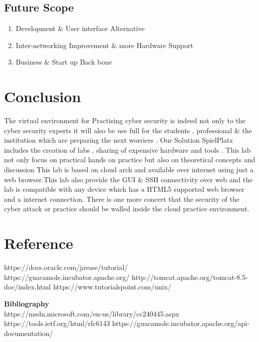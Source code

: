 \documentclass[12pt,a4paper,final,oneside]{report}
\begin{document}
\section{Future Scope}
\begin{enumerate}
\item Development \& User interface Alternative
\item Inter-networking Improvement \& more Hardware Support
\item Business \& Start up Back bone
\end{enumerate}
\chapter{Conclusion}
\large The virtual environment for Practising cyber security is indeed not only to the cyber security experts it will also be use full for the students , professional \& the institution which are preparing the next worriers . Our Solution SpielPlatz 	includes the creation of labs , sharing of  expensive hardware and tools . This lab not only focus on practical hands on practice but also on theoretical concepts and  discussion  This lab is based on cloud arch and available over 	internet using just a web browser.This lab also provide the GUI \& SSH 	connectivity over web and the lab is compatible with any device which has a HTML5 supported web browser and a internet connection. There is one more concert that the security of the cyber attack or practice should be walled inside the cloud practice environment.
\chapter{Reference}
https://docs.oracle.com/javase/tutorial/
https://guacamole.incubator.apache.org/
http://tomcat.apache.org/tomcat-8.5-doc/index.html
https://www.tutorialspoint.com/unix/

\vspace{2cm}
{\huge \textbf{Bibliography}}
\newline
\\
\vspace{1cm}
https://msdn.microsoft.com/en-us/library/cc240445.aspx
https://tools.ietf.org/html/rfc6143
https://guacamole.incubator.apache.org/api-documentation/
\end{document}
